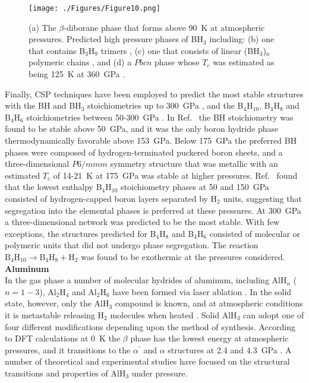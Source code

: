 \documentclass[12pt,letterpaper,oneside]{article}
\begin{document}
\begin{figure}[h]
\begin{center}
\texttt{[image: ./Figures/Figure10.png]}
\end{center}
\caption{(a) The $\beta$-diborane phase that forms above 90~K at atmospheric pressures. Predicted high pressure phases of BH$_3$ including: (b) one that contains B$_3$H$_9$ trimers \cite{Yao:2011a}, (c) one that consists of linear (BH$_3$)$_n$ polymeric chains \cite{Yao:2011a}, and (d) a $Pbcn$ phase whose $T_c$ was estimated as being 125~K at 360~GPa \cite{Abe:2011a}.}
\label{fig:borane}
\end{figure}


Finally, CSP techniques have been employed to predict the most stable structures with the BH and BH$_3$ stoichiometries up to 300~GPa \cite{Hu:2013-B}, and the B$_4$H$_{10}$, B$_4$H$_8$ and B$_4$H$_6$ stoichiometries between 50-300~GPa \cite{Suarez:2014-B}. In Ref.\ \cite{Hu:2013-B} the BH stoichiometry was found to be stable above 50~GPa, and it was the only boron hydride phase thermodynamically favorable above 153~GPa. Below 175~GPa the preferred BH phases were composed of hydrogen-terminated puckered boron sheets, and a three-dimensional $P6/mmm$ symmetry structure that was metallic with an estimated $T_c$ of 14-21~K at 175~GPa was stable at higher pressures.
Ref.\ \cite{Suarez:2014-B} found that the lowest enthalpy B$_4$H$_{10}$ stoichiometry phases at 50 and 150~GPa consisted of hydrogen-capped boron layers separated by H$_2$ units, suggesting that segregation into the elemental phases is preferred at these pressures. At 300~GPa a three-dimensional network was predicted to be the most stable. With few exceptions, the structures predicted for B$_4$H$_8$ and B$_4$H$_6$ consisted of molecular or polymeric units that did not undergo phase segregation. The reaction $\text{B}_4\text{H}_{10} \rightarrow \text{B}_4\text{H}_{8}+\text{H}_2$ was found to be exothermic at the pressures considered.\\

\noindent\textbf{Aluminum}\\
%
In the gas phase a number of molecular hydrides of aluminum, including AlH$_n$ ($n=1-3$), Al$_2$H$_4$ and Al$_2$H$_6$ have been formed via laser ablation \cite{Wang:2003-Al}. In the solid state, however, only the AlH$_3$ compound is known, and at atmospheric conditions it is metastable releasing H$_2$ molecules when heated \cite{Sinke:1967-Al}. Solid AlH$_3$ can adopt one of four different modifications depending upon the method of synthesis. According to DFT calculations at 0~K the $\beta$ phase has the lowest energy at atmospheric pressures, and it transitions to the $\alpha^\prime$ and $\alpha$ structures at 2.4 and 4.3~GPa \cite{Vajeeston:2008-Al}. A number of theoretical \cite{Lu:2012-Al,Vajeeston:2008-Al,Feng:2014-Al,Graetz:2006-Al} and experimental \cite{Tkacz:2008-Al,Drozd:2012-Al,Shimura:2010-Al,Graetz:2006-Al,Molodets:2009-Al,Besedin:2011-Al} studies have focused on the structural transitions and properties of AlH$_3$ under pressure. 
\end{document}
